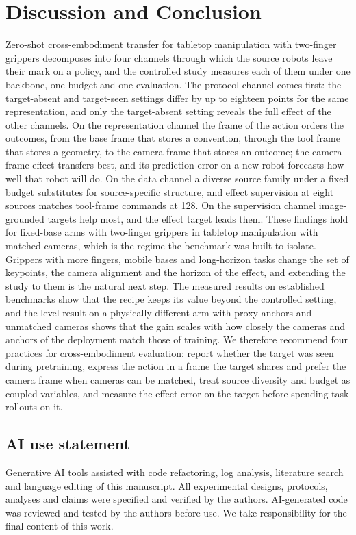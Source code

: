 \section{Discussion and Conclusion}
\label{sec:conclusion}

Zero-shot cross-embodiment transfer for tabletop manipulation with two-finger grippers decomposes into four channels through which the source robots leave their mark on a policy, and the controlled study measures each of them under one backbone, one budget and one evaluation. The protocol channel comes first: the target-absent and target-seen settings differ by up to eighteen points for the same representation, and only the target-absent setting reveals the full effect of the other channels. On the representation channel the frame of the action orders the outcomes, from the base frame that stores a convention, through the tool frame that stores a geometry, to the camera frame that stores an outcome; the camera-frame effect transfers best, and its prediction error on a new robot forecasts how well that robot will do. On the data channel a diverse source family under a fixed budget substitutes for source-specific structure, and effect supervision at eight sources matches tool-frame commands at 128. On the supervision channel image-grounded targets help most, and the effect target leads them. These findings hold for fixed-base arms with two-finger grippers in tabletop manipulation with matched cameras, which is the regime the benchmark was built to isolate. Grippers with more fingers, mobile bases and long-horizon tasks change the set of keypoints, the camera alignment and the horizon of the effect, and extending the study to them is the natural next step. The measured results on established benchmarks show that the recipe keeps its value beyond the controlled setting, and the level result on a physically different arm with proxy anchors and unmatched cameras shows that the gain scales with how closely the cameras and anchors of the deployment match those of training. We therefore recommend four practices for cross-embodiment evaluation: report whether the target was seen during pretraining, express the action in a frame the target shares and prefer the camera frame when cameras can be matched, treat source diversity and budget as coupled variables, and measure the effect error on the target before spending task rollouts on it.

\subsection*{AI use statement}
Generative AI tools assisted with code refactoring, log analysis, literature search and language editing of this manuscript. All experimental designs, protocols, analyses and claims were specified and verified by the authors. AI-generated code was reviewed and tested by the authors before use. We take responsibility for the final content of this work.


